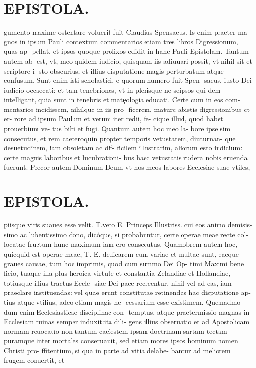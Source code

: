 \documentclass{article}
\begin{document}
\begin{pages}
\section*{EPISTOLA. }\pstart gumento maxime ostentare voluerit fuit Claudius Spensaeus. Is enim praeter ma- gnos in ipsum Pauli contextum commentarios etiam tres libros Digressionum, quas ap- pellat, et ipsos quoque prolixos edidit in hanc Pauli Epistolam. Tantum autem ab- est, vt, meo quidem iudicio, quisquam iis adiuuari possit, vt nihil sit et scriptore i- sto obscurius, et illius disputatione magis perturbatum atque confusum. Sunt enim isti scholastici, e quorum numero fuit Spen- saeus, iusto Dei iudicio occaecati: et tam tenebriones, vt in plerisque ne seipsos qui dem intelligant, quia sunt in tenebris et matȩologia educati. Certe cum in eos com- mentarios incidissem, nihilque in iis pro- ficerem, mature abistis digressionibus et er- rore ad ipsum Paulum et verum iter redii, fe- cique illud, quod habet prouerbium ve- tus bibi et fugi. Quantum autem hoc meo la- bore ipse sim consecutus, et rem caeteroquin propter temporis vetustatem, diuturnan- que desuetudinem, iam obsoletam ac dif- ficilem illustrarim, aliorum esto iudicium: certe magnis laboribus et lucubrationi- bus haec vetustatis rudera nobis eruenda fuerunt. Precor autem Dominum Deum vt hos meos labores Ecclesiae suae vtiles,  \pend
\section*{EPISTOLA. }\pstart piisque viris suaues esse velit. T.vero E. Princeps Illustriss. cui eos animo demisis- simo ac lubentissimo dono, dicóque, si probabuntur, certe operae meae recte col- locatae fructum hunc maximum iam ero consecutus. Quamobrem autem hoc, quicquid est operae meae, T. E. dedicarem cum variae et multae sunt, eaeque graues causae, tum hoc imprimis, quod cum summo Dei Op- timi Maximi bene ficio, tuaque illa plus heroica virtute et constantia Zelandiae et Hollandiae, totiusque illius tractus Eccle- siae Dei pace recreentur, nihil vel ad eas, iam praeclare instituendas: vel quae erunt constitutae retinendas hac disputatione ap- tius atque vtilius, adeo etiam magis ne- cessarium esse existimem. Quemadmo- dum enim Ecclesiasticae disciplinae con- temptus, atque praetermissio magnas in Ecclesiam ruinas semper induxit:ita dili- gens illius obseruatio et ad Apostolicam normam reuocatio non tantum caelestem ipsam doctrinam sartam tectam puramque inter mortales conseruauit, sed etiam mores ipsos hominum nomen Christi pro- ffitentium, si qua in parte ad vitia delabe- bantur ad meliorem frugem conuertit, et  \pend

\end{pages}
\end{document}
